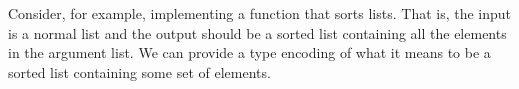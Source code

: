 \documentclass[12pt,twoside,notitlepage]{report}
\begin{document}
Consider, for example, implementing a function that sorts lists. That is, the input is a normal list and the output should be a sorted list containing all the elements in the argument list.
We can provide a type encoding of what it means to be a sorted list containing some set of elements. 
\begin{code}
\\
\>[0]\<[2]%
\>[2]  \AgdaSymbol{:} \AgdaSymbol{\{} \AgdaSymbol{:} \AgdaSymbol{\}}       \<%
\\
\>[2]\<[4]%
\>[4]\AgdaInductiveConstructor{[]} \AgdaSymbol{:}  \AgdaInductiveConstructor{[]}\<%
\\
\>[2]\<[4]%
\>[4]\AgdaInductiveConstructor{[\_]} \AgdaSymbol{:} \AgdaSymbol{(} \AgdaSymbol{:} \AgdaSymbol{)}   \AgdaSymbol{(}  \AgdaInductiveConstructor{[]}\AgdaSymbol{)}\<%
\\
\>[2]\<[4]%
\>[4] \AgdaSymbol{:}  \AgdaSymbol{\{} \AgdaSymbol{:} \AgdaSymbol{\}} \AgdaSymbol{\{} \AgdaSymbol{:}   \AgdaSymbol{\}} \AgdaSymbol{\{}\AgdaSymbol{\}}\<%
\\
\>[4]\<[10]%
\>[10] \AgdaSymbol{(} \AgdaSymbol{:} \AgdaSymbol{)}\<%
\\
\>[4]\<[10]%
\>[10] \AgdaSymbol{(} \AgdaSymbol{:}  \AgdaSymbol{)}\<%
\\
\>[4]\<[10]%
\>[10] \AgdaSymbol{(}      \AgdaSymbol{)}   \AgdaSymbol{)}\<%
\\
\>[4]\<[10]%
\>[10] \AgdaSymbol{(}    \AgdaSymbol{)}\<%
\\
\>[4]\<[10]%
\>[10] \AgdaSymbol{(} \AgdaSymbol{)}\<%
\\
\end{code}
\end{document}
